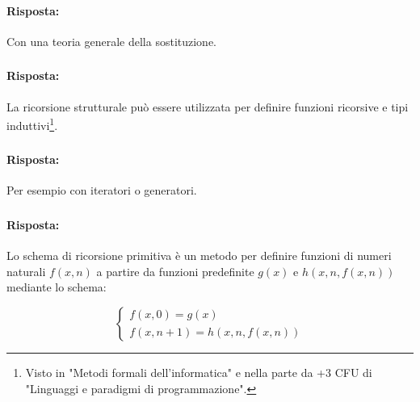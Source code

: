 
\paragraph{Risposta:} Con una teoria generale della sostituzione.

\subsubsection{}


\paragraph{Risposta:} La ricorsione strutturale può essere utilizzata per definire funzioni ricorsive e tipi induttivi\footnote{Visto in "Metodi formali dell'informatica" e nella parte da +3 CFU di "Linguaggi e paradigmi di programmazione".}.

\subsubsection{}


\paragraph{Risposta:} Per esempio con iteratori o generatori.

\subsubsection{}


\paragraph{Risposta:} Lo schema di ricorsione primitiva è un metodo per definire funzioni di numeri 
naturali $f(x, n)$ a partire da funzioni predefinite $g(x)$ e $h(x, n, f(x, n))$ mediante lo schema:

$$
\begin{cases}
    f(x, 0) = g(x) \\
    f(x, n+1) = h(x, n, f(x, n))
\end{cases}
$$

